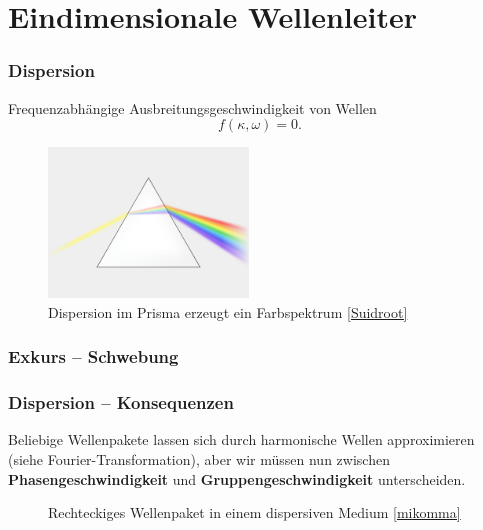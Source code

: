 \documentclass[hyperref={pdfpagemode=FullScreen, colorlinks=false}]{beamer}
\begin{document}
\maketitle

\section{Eindimensionale Wellenleiter}

\begin{frame}
\frametitle{Dispersion}
Frequenzabhängige Ausbreitungsgeschwindigkeit von Wellen 
\begin{equation*}
  f(\kappa,\omega)=0.
\end{equation*}
\begin{figure}
\includegraphics[width=0.475\textwidth]{fig_img/wikipedia_dispersion.png}
\caption*{Dispersion im Prisma erzeugt ein Farbspektrum \href{https://commons.wikimedia.org/w/index.php?curid=3728535}{[Suidroot]}}
\end{figure}
\end{frame}


\begin{frame}
\frametitle{Exkurs -- Schwebung}


\end{frame}


\begin{frame}
\frametitle{Dispersion -- Konsequenzen}
  Beliebige Wellenpakete lassen sich durch harmonische Wellen approximieren (siehe Fourier-Transformation), aber wir müssen nun zwischen \textbf{Phasengeschwindigkeit} und \textbf{Gruppengeschwindigkeit} unterscheiden.

\vspace{-7cm}  
\begin{figure}
\hspace{5cm}

\vspace{3cm}

\caption*{Rechteckiges Wellenpaket in einem dispersiven Medium \href{http://www.mikomma.de/optik/disp/dispimp.htm}{[mikomma]}}
\end{figure}
\end{frame}
\end{document}
